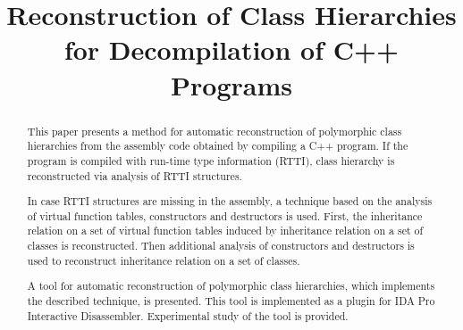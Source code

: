 \documentclass[10pt, conference]{IEEEtran}
\begin{document}
\title{Reconstruction of Class Hierarchies for Decompilation of C++ Programs}

\author{
}

\maketitle
\thispagestyle{plain}

\begin{abstract}
This paper presents a method for automatic reconstruction of
polymorphic class hierarchies from the assembly code obtained by
compiling a C++ program.
If the program is compiled with run-time type information (RTTI),
class hierarchy is reconstructed via analysis of RTTI structures.

In case RTTI structures are missing in the assembly, a technique
based on the analysis of virtual function tables, constructors and
destructors is used.
First, the inheritance relation on a set of virtual function tables
induced by inheritance relation on a set of classes is reconstructed.
Then additional analysis of constructors and destructors is used to
reconstruct inheritance relation on a set of classes.

A tool for automatic reconstruction of polymorphic class hierarchies,
which implements the described technique, is presented.
This tool is implemented as a plugin for IDA Pro Interactive Disassembler.
Experimental study of the tool is provided.
\end{abstract}
\end{document}
